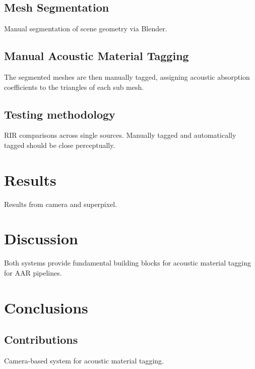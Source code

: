 \subsection{Mesh Segmentation}
Manual segmentation of scene geometry via Blender.

\subsection{Manual Acoustic Material Tagging}
The segmented meshes are then manually tagged, assigning acoustic absorption coefficients to the triangles of each sub mesh.

\subsection{Testing methodology}
RIR comparisons across single sources. Manually tagged and automatically tagged should be close perceptually.


\section{Results}
Results from camera and superpixel.


\section{Discussion}
Both systems provide fundamental building blocks for acoustic material tagging for AAR pipelines.

\section{Conclusions}

\subsection{Contributions}
Camera-based system for acoustic material tagging.

